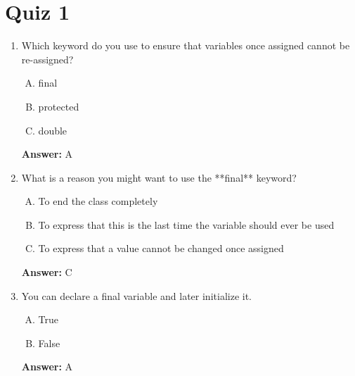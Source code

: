 \documentclass[12pt]{article}
\begin{document}
\bigskip

\section{Quiz 1}

\bigskip

\begin{enumerate}[1.]
    \item

    Which keyword do you use to ensure that variables once assigned cannot be
    re-assigned?

    \bigskip

    \begin{enumerate}[A.]
        \item final
        \item protected
        \item double
    \end{enumerate}

    \bigskip

    \textbf{Answer:} A

    \item

    What is a reason you might want to use the **final** keyword?

    \bigskip

    \begin{enumerate}[A.]
        \item To end the class completely
        \item To express that this is the last time the variable should ever be used
        \item To express that a value cannot be changed once assigned
    \end{enumerate}

    \bigskip

    \textbf{Answer:} C

    \item

    You can declare a final variable and later initialize it.

    \bigskip

    \begin{enumerate}[A.]
        \item True
        \item False
    \end{enumerate}

    \bigskip

    \textbf{Answer:} A
\end{enumerate}
\end{document}
